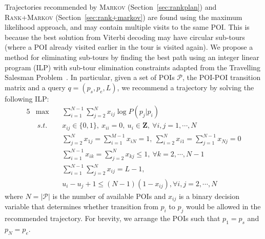 Trajectories recommended by \textsc{Markov} (Section~\ref{sec:rankplan}) and \textsc{Rank+Markov} (Section~\ref{sec:rank+markov})
are found using the maximum likelihood approach, and may contain multiple visits to the same POI.
This is because the best solution from Viterbi decoding %
may have 
circular sub-tours (where a POI already visited earlier in the tour is visited again).
We propose a method for eliminating sub-tours by %
%
finding the best path using an integer linear program (ILP) with
sub-tour elimination constraints adapted from the Travelling Salesman Problem~\cite{opt98}.
In particular, given a set of POIs $\mathcal{P}$, the POI-POI transition matrix and a query $q = (p_s, p_e, L)$,
we recommend a trajectory by solving the following ILP:
\begin{alignat}{5}
& \max  ~&& \sum_{i=1}^{N-1} \sum_{j=2}^N x_{ij} \log P(p_j | p_i)                                                 \nonumber \\
& ~s.t. ~&& x_{ij} \in \{0, 1\}, ~x_{ii} = 0, ~u_i \in \mathbf{Z}, ~\forall i, j = 1, \cdots, N                    \label{eq:cons1} \\
&        && \sum_{j=2}^N x_{1j} = \sum_{i=1}^{M-1} x_{iN} = 1, ~\sum_{i=2}^N x_{i1} = \sum_{j=1}^{N-1} x_{Nj} = 0  \label{eq:cons2} \\
&        && \sum_{i=1}^{N-1} x_{ik} = \sum_{j=2}^N x_{kj} \le 1,   ~\forall k=2, \cdots, N-1                       \label{eq:cons3} \\
&        && \sum_{i=1}^{N-1} \sum_{j=2}^N x_{ij} = L-1,                                                            \label{eq:cons4} \\
&        && u_i - u_j + 1 \le (N-1) (1-x_{ij}),                     \forall i, j = 2, \cdots, N                    \label{eq:cons5}
\end{alignat}
where $N=|\mathcal{P}|$ is the number of available POIs and $x_{ij}$ is a binary decision variable 
that determines whether transition from $p_i$ to $p_j$ would be allowed in the recommended trajectory.
For brevity, we arrange the POIs such that $p_1 = p_s$ and $p_N = p_e$.
